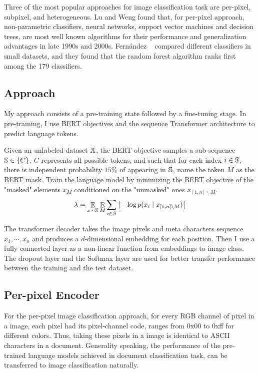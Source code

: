 \documentclass[review]{cvpr}
\begin{document}
Three of the most popular approaches for image classification task are per-pixel, subpixel, and heterogeneous.
Lu and Weng found that, for per-pixel approach, non-parametric classifiers, \eg neural networks, support vector machines and decision trees,
are most well known algorithms for their performance and generalization advantages in late 1990s and 2000s.
Fern{\'a}ndez \etal~\cite{fernandez2014we} compared different classifiers in small datasets, and they found that the random forest algorithm ranks first among the 179 classifiers.

\subsection{Approach}

My approach consists of a pre-training state followed by a fine-tuning stage.
In pre-training, I use BERT objectives and the sequence Transformer architecture to predict language tokens.

\par Given an unlabeled dataset $\Bbb X$, the BERT objective samples a sub-sequence $\Bbb S \in \{C\}$,
$C$ represents all possible tokens, and such that for each index $i \in \Bbb S$,
there is independent probability $15\%$ of appearing in $\Bbb S$,
name the token $M$ as the BERT mask.
Train the language model by minimizing the BERT objective of the "masked" elements $x_M$
conditioned on the "unmasked" ones $x_{\left[1,n\right]\backslash M}$.
\[
  \lambda = \mathop{\Bbb E}\limits_{x\sim\Bbb X} \mathop{\Bbb E}\limits_{M} \sum_{i\in S}{\bigl[-\log{p(x_i\mid x_{\left[1,n \right]\backslash M})\bigr]}}
\]

\par The transformer decoder takes the image pixels and meta characters sequence $x_1,\cdots,x_n$ and produces a $d$-dimensional
embedding for each position.
Then I use a fully connected layer as a non-linear function from embeddings to image class.
The dropout layer and the Softmax layer are used for better transfer performance between the training and the test dataset.

\subsection{Per-pixel Encoder}

For the per-pixel image classification approach, for every RGB channel of pixel in a image,
each pixel had its pixel-channel code, ranges from 0x00 to 0xff for different colors.
Thus, taking these pixels in a image is identical to ASCII characters in a document.
Generality speaking, the performance of the pre-trained language models achieved in document classification task, can be transferred to image classification naturally.
\end{document}
